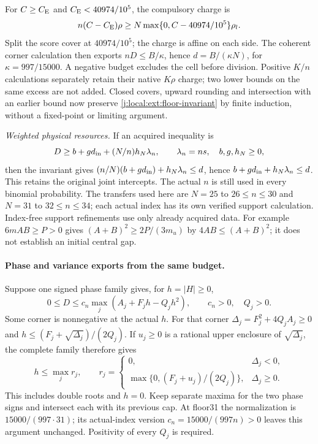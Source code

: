 For $C\ge C_{\mathrm E}$ and $C_{\mathrm E}<40974/10^5$, the compulsory charge is
\[
 n(C-C_{\mathrm E})\rho\ge
 N\max\{0,C-40974/10^5\}\rho_l.
\]
Split the score cover at $40974/10^5$; the charge is affine on
each side. The coherent corner calculation then exports
$nD\le B/\kappa$, hence $d=B/(\kappa N)$, for
$\kappa=997/15000$. A negative budget excludes the cell before
division. Positive $K/n$ calculations separately retain their native
$K\rho$ charge; two lower bounds on the same excess are not added.
Closed covers, upward rounding and intersection with an earlier
bound now preserve \eqref{j:local:ext:floor-invariant} by finite
induction, without a fixed-point or limiting argument.

\emph{Weighted physical resources.} If an acquired inequality is
\[
 D\ge b+g d_{\rm in}+(N/n)h_N\lambda_n,
 \qquad \lambda_n=ns,\quad b,g,h_N\ge0,
\]
then the invariant gives
$(n/N)(b+g d_{\rm in})+h_N\lambda_n\le d$, hence
$b+g d_{\rm in}+h_N\lambda_n\le d$.
This retains the original joint intercepts. The actual $n$ is still
used in every binomial probability. The transfers used here are
$N=25$ to $26\le n\le30$ and $N=31$ to $32\le n\le34$;
each actual index has its own verified support calculation.
Index-free support refinements use only already acquired data. For
example $6mAB\ge P>0$ gives $(A+B)^2\ge2P/(3m_u)$ by
$4AB\le(A+B)^2$; it does not establish an initial central gap.

\paragraph{Phase and variance exports from the same budget.}
Suppose one signed phase family gives, for $h=|H|\ge0$,
\[
 0\le D\le c_n\max_j(A_j+F_jh-Q_jh^2),\qquad c_n>0,
 \quad Q_j>0.
\]
Some corner is nonnegative at the actual $h$. For that corner
$\Delta_j=F_j^2+4Q_jA_j\ge0$ and
$h\le(F_j+\sqrt{\Delta_j})/(2Q_j)$.
If $u_j\ge0$ is a rational upper enclosure of $\sqrt{\Delta_j}$,
the complete family therefore gives
\[
 h\le\max_j r_j,\qquad
 r_j=\begin{cases}0,&\Delta_j<0,\\
 \max\{0,(F_j+u_j)/(2Q_j)\},&\Delta_j\ge0.
 \end{cases}
\]
This includes double roots and $h=0$. Keep separate maxima for
the two phase signs and intersect each with its previous cap.
At floor31 the normalization is $15000/(997\cdot31)$; its
actual-index version $c_n=15000/(997n)>0$ leaves this argument
unchanged. Positivity of every $Q_j$ is required.

